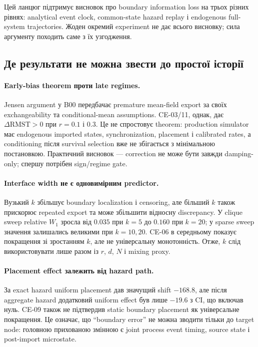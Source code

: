 \documentclass[11pt,a4paper]{article}
\begin{document}
Цей ланцюг підтримує висновок про boundary information loss на трьох різних
рівнях: analytical event clock, common-state hazard replay і endogenous
full-system trajectories. Жоден окремий experiment не дає всього висновку;
сила аргументу походить саме з їх узгодження.

\subsection{Де результати не можна звести до простої історії}

\paragraph{Early-bias theorem проти late regimes.}
Jensen argument у B00 передбачає premature mean-field export за своїх
exchangeability та conditional-mean assumptions. CE-03/11, однак, дає
$\Delta\mathrm{RMST}>0$ при $r=0.1$ і $0.3$. Це не спростовує theorem:
production simulator має endogenous imported states, synchronization,
placement і calibrated rates, а conditioning після survival selection вже не
збігається з мінімальною постановкою. Практичний висновок --- correction не
може бути завжди damping-only; спершу потрібен sign/regime gate.

\paragraph{Interface width не є одновимірним predictor.}
Вузький $k$ збільшує boundary localization і censoring, але більший $k$ також
прискорює repeated export та може збільшити відносну discrepancy. У clique
sweep relative $W_1$ зросла від $0.035$ при $k=5$ до $0.160$ при $k=20$; у
sparse sweep значення залишались великими при $k=10,20$. CE-06 в середньому
показує покращення зі зростанням $k$, але не універсальну монотонність.
Отже, $k$ слід використовувати лише разом із $r$, $d$, $N$ і mixing proxy.

\paragraph{Placement effect залежить від hazard path.}
За exact hazard uniform placement дав значущий shift $-168.8$, але після
aggregate hazard додатковий uniform effect був лише $-19.6$ з CI, що включав
нуль. CE-09 також не підтвердив static boundary placement як універсальне
покращення. Це означає, що ``boundary error'' не можна зводити тільки до target
node: головною прихованою змінною є joint process event timing, source state і
post-import microstate.
\end{document}
